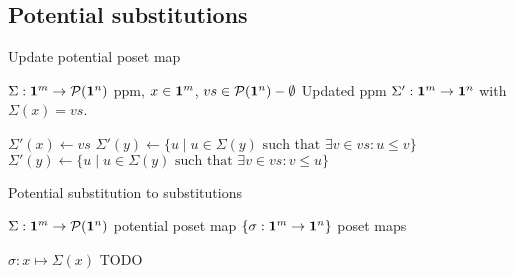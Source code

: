 \subsection{Potential substitutions}


\begin{algorithm}[H]
  \caption{Update potential poset map}\label{alg:updateppm}
  \begin{algorithmic}
    \Require $\Sigma : \mathbf{1}^{m} \to \mathcal{P}({\mathbf{1}^{n}})$ ppm, $x \in
    \mathbf{1}^{m}$, $vs \in \mathcal{P}({\mathbf{1}^{n}}) - \emptyset$
    \Ensure Updated ppm $\Sigma' : \mathbf{1}^{m} \to \mathbf{1}^{n}$ with $\Sigma(x) = vs$.

    \State $\Sigma'(x) \gets vs$
    \State $\Sigma'(y) \gets \{ u \mid u \in \Sigma(y) \text{ such that } \exists
    v \in vs : u \leq v \} $
    \State $\Sigma'(y) \gets \{ u \mid u \in \Sigma(y) \text{ such that } \exists
    v \in vs : v \leq u \} $
    \EndIf
    \EndFor
    \State {}
    \EndProcedure
  \end{algorithmic}
\end{algorithm}



\begin{algorithm}[H]
  \caption{Potential substitution to substitutions}\label{alg:getsubsts}
  \begin{algorithmic}
    \Require $\Sigma : \mathbf{1}^{m} \to \mathcal{P}({\mathbf{1}^{n}})$ potential poset map
    \Ensure $\{ \sigma : \mathbf{1}^{m} \to \mathbf{1}^{n} \}$ poset maps
    
    \State $\sigma : x \mapsto \Sigma(x) $
    TODO
    \EndProcedure
  \end{algorithmic}
\end{algorithm}






